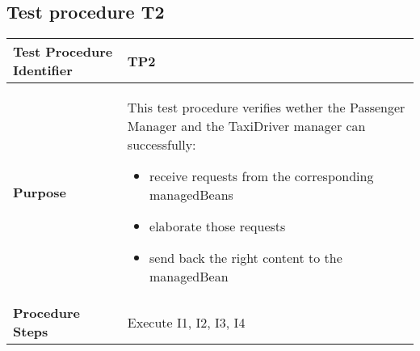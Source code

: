 \subsection{Test procedure T2}

\begin{table}[!htbp]
\begin{center}
\begin{tabular}[t]{p{}p{}}

\hline
\textbf{Test Procedure Identifier} & TP2 \\
\hline
\textbf{Purpose} & This test procedure verifies wether the Passenger Manager and the TaxiDriver manager can successfully:
\begin{itemize}
	\item receive requests from the corresponding managedBeans
	\item elaborate those requests
	\item send back the right content to the managedBean
\end{itemize} \\
\hline
\textbf{Procedure Steps} & Execute I1, I2, I3, I4 \\
\hline

\end{tabular}
\end{center}
\end{table}
\clearpage
